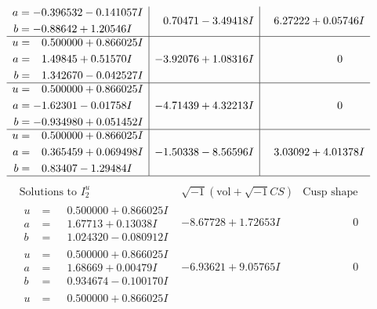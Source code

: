 \documentclass[1p]{elsarticle_modified}
\theoremstyle{definition}
\newcommand{\I}{\sqrt{-1}}
\begin{document}
$$\begin{array}{c|c|c}
\begin{aligned}
a &= -0.396532 - 0.141057 I \\
b &= -0.88642 + 1.20546 I\end{aligned}
 & \phantom{-}0.70471 - 3.49418 I & \phantom{-}6.27222 + 0.05746 I \\ \hline\begin{aligned}
u &= \phantom{-}0.500000 + 0.866025 I \\
a &= \phantom{-}1.49845 + 0.51570 I \\
b &= \phantom{-}1.342670 - 0.042527 I\end{aligned}
 & -3.92076 + 1.08316 I & \phantom{-0.000000 } 0 \\ \hline\begin{aligned}
u &= \phantom{-}0.500000 + 0.866025 I \\
a &= -1.62301 - 0.01758 I \\
b &= -0.934980 + 0.051452 I\end{aligned}
 & -4.71439 + 4.32213 I & \phantom{-0.000000 } 0 \\ \hline\begin{aligned}
u &= \phantom{-}0.500000 + 0.866025 I \\
a &= \phantom{-}0.365459 + 0.069498 I \\
b &= \phantom{-}0.83407 - 1.29484 I\end{aligned}
 & -1.50338 - 8.56596 I & \phantom{-}3.03092 + 4.01378 I\\
 \hline 
 \end{array}$$\newpage$$\begin{array}{c|c|c}  
\text{Solutions to }I^u_{2}& \I (\text{vol} + \sqrt{-1}CS) & \text{Cusp shape}\\
 \hline 
\begin{aligned}
u &= \phantom{-}0.500000 + 0.866025 I \\
a &= \phantom{-}1.67713 + 0.13038 I \\
b &= \phantom{-}1.024320 - 0.080912 I\end{aligned}
 & -8.67728 + 1.72653 I & \phantom{-0.000000 } 0 \\ \hline\begin{aligned}
u &= \phantom{-}0.500000 + 0.866025 I \\
a &= \phantom{-}1.68669 + 0.00479 I \\
b &= \phantom{-}0.934674 - 0.100170 I\end{aligned}
 & -6.93621 + 9.05765 I & \phantom{-0.000000 } 0 \\ \hline\begin{aligned}
u &= \phantom{-}0.500000 + 0.866025 I \\

\end{aligned}
\end{array}$$
\end{document}
